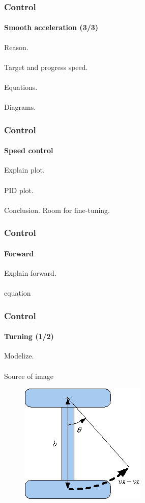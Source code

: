 \documentclass{beamer}
\begin{document}

\begin{frame}
\frametitle{Control}
\framesubtitle{Smooth acceleration (3/3)}
Reason.\\~\\
Target and progress speed.\\~\\
Equations.\\~\\
Diagrams.
\end{frame}


\begin{frame}
\frametitle{Control}
\framesubtitle{Speed control}
Explain plot.\\~\\
PID plot.\\~\\
Conclusion. Room for fine-tuning.
\end{frame}


\begin{frame}
\frametitle{Control}
\framesubtitle{Forward}
Explain forward.\\~\\
equation
\end{frame}


\begin{frame}
\frametitle{Control}
\framesubtitle{Turning (1/2)}
Modelize.\\~\\
Source of image
\begin{figure}[hbtp]
\centering
\includegraphics[scale=0.5]{figures/differential-system.jpg}
\end{figure}
\end{frame}
\end{document}
